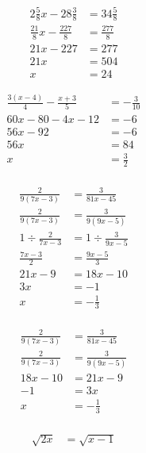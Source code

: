 \documentclass{article}
\begin{document}
\[\begin{aligned}
    2\frac58x-28\frac38&=34\frac58\\
    \frac{21}8x-\frac{227}8&=\frac{277}8\\
    21x-227&=277\\
    21x&=504\\
    x&=\boxed{24}
\end{aligned}\]

\[\begin{aligned}
    \frac{3(x-4)}4-\frac{x+3}5&=-\frac3{10}\\
    60x-80-4x-12&=-6\\
    56x-92&=-6\\
    56x&=84\\
    x&=\boxed{\frac32}\\
\end{aligned}\]

\newpage
\[\begin{aligned}
    \frac2{9(7x-3)}&=\frac3{81x-45}\\
    \frac2{9(7x-3)}&=\frac3{9(9x-5)}\\
    1\div\frac2{7x-3}&=1\div\frac3{9x-5}\\
    \frac{7x-3}2&=\frac{9x-5}3\\
    21x-9&=18x-10\\
    3x&=-1\\
    x&=\boxed{-\frac13}\\
\end{aligned}\]

\[\begin{aligned}
    \frac2{9(7x-3)}&=\frac3{81x-45}\\
    \frac2{9(7x-3)}&=\frac3{9(9x-5)}\\
    18x-10&=21x-9\\
    -1&=3x\\
    x&=\boxed{-\frac13}\\
\end{aligned}\]

\[\begin{aligned}
    \sqrt{2x}&=\sqrt{x-1}
\end{aligned}\]
\end{document}
